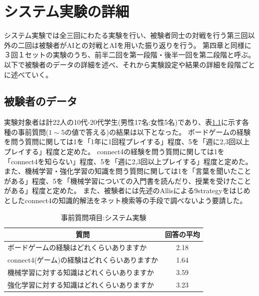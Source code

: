 \chapter{システム実験の詳細}
\label{chap:system}
システム実験では全三回にわたる実験を行い、被験者同士の対戦を行う第三回以外の二回は被験者がAIとの対戦とAIを用いた振り返りを行う。
第四章と同様に３回１セットの実験のうち、前半二回を第一段階・後半一回を第二段階と呼ぶ。
以下で被験者のデータの詳細を述べ、それから実験設定や結果の詳細を段階ごとに述べていく。
\section{被験者のデータ}
実験対象者は計22人の10代-20代学生(男性17名:女性5名)であり、表\ref{table:before}に示す各種の事前質問($1\sim5$の値で答える)の結果は以下となった。
ボードゲームの経験を問う質問に関しては1を「1年に1回程プレイする」程度、5を「週に2,3回以上プレイする」程度と定めた。
connect4の経験を問う質問に関しては1を「connect4を知らない」程度、5を「週に2,3回以上プレイする」程度と定めた。
また、機械学習・強化学習の知識を問う質問に関しては1を「言葉を聞いたことがある」程度、5を「機械学習についての入門書を読んだり、授業を受けたことがある」程度と定めた。
また、被験者には先述のAllis\cite{allis}による9strategyをはじめとしたconnect4の知識的解法をネット検索等の手段で調べないよう要請した。
\begin{table}[H]
    \caption{事前質問項目:システム実験}
    \label{table:before}
	\scriptsize
    \begin{tabular}{l||c}
        \multicolumn{1}{c|}{質問} & 回答の平均\\ \hline \hline
        ボードゲームの経験はどれくらいありますか & 2.18\\
        connect4(ゲーム)の経験はどれくらいありますか& 1.64\\\hline
        機械学習に対する知識はどれくらいありますか& 3.59\\
        強化学習に対する知識はどれくらいありますか& 3.23\\
    \end{tabular}
    
\end{table}
